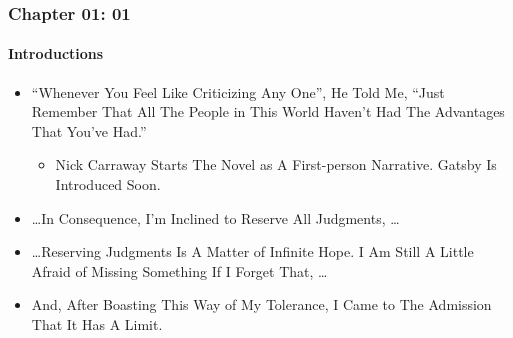 \begin{frame}
\frametitle{Chapter 01: 01}
\framesubtitle{Introductions}
\label{slide:chapter-01-01}
\begin{itemize}
\item ``Whenever You Feel Like Criticizing Any One'', He Told Me, ``Just Remember That All The People in This World Haven't Had The Advantages That You've Had.''
\begin{itemize}
\pause
\item Nick Carraway Starts The Novel as A First-person Narrative. \alert{Gatsby} Is Introduced Soon. 
\end{itemize}
\pause
\item \dots In Consequence, I'm Inclined to Reserve All Judgments, \dots
\pause
\item \dots Reserving Judgments Is A Matter of \alert{Infinite Hope}. I Am Still A Little Afraid of Missing Something If I Forget That, \dots
\pause
\item And, After Boasting \alert{This Way of My Tolerance}, I Came to The Admission That It Has A Limit.
\end{itemize}
\end{frame}
